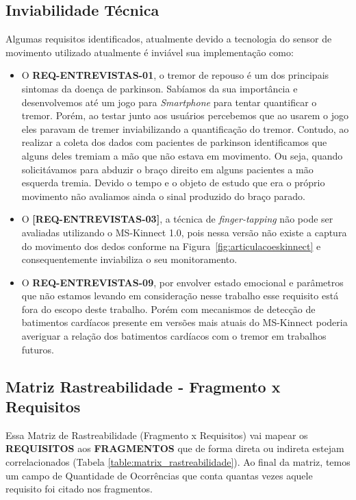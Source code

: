 \subsection{Inviabilidade Técnica}
Algumas requisitos identificados, atualmente devido a tecnologia do sensor de movimento utilizado atualmente é inviável sua implementação como:
\begin{itemize}
  \item O \textbf{REQ-ENTREVISTAS-01}, o tremor de repouso é um dos principais sintomas da doença de parkinson. Sabíamos da sua importância e desenvolvemos até um jogo para \textit{Smartphone} para tentar quantificar o tremor. Porém, ao testar junto aos usuários percebemos que ao usarem o jogo eles paravam de tremer inviabilizando a quantificação do tremor. 
	Contudo, ao realizar a coleta dos dados com pacientes de parkinson identificamos que alguns deles tremiam a mão que não estava em movimento. Ou seja, quando solicitávamos para abduzir o braço direito em alguns pacientes a mão esquerda tremia. Devido o tempo e o objeto de estudo que era o próprio movimento não avaliamos ainda o sinal produzido do braço parado.
	\item O \textbf{[REQ-ENTREVISTAS-03]}, a técnica de \textit{finger-tapping} não pode ser avaliadas utilizando o MS-Kinnect 1.0, pois nessa versão não existe a captura do movimento dos dedos conforme na Figura~\ref{fig:articulacoeskinnect} e consequentemente inviabiliza o seu monitoramento.
	\item O \textbf{REQ-ENTREVISTAS-09}, por envolver estado emocional e parâmetros que não estamos levando em consideração nesse trabalho esse requisito está fora do escopo deste trabalho. Porém com mecanismos de detecção de batimentos cardíacos presente em versões mais atuais do MS-Kinnect poderia averiguar a relação dos batimentos cardíacos com o tremor em trabalhos futuros.
\end{itemize}

\subsection{Matriz Rastreabilidade - Fragmento x Requisitos}
Essa Matriz de Rastreabilidade (Fragmento x Requisitos) vai mapear os \textbf{REQUISITOS} aos \textbf{FRAGMENTOS} que de forma direta ou indireta estejam correlacionados (Tabela \ref{table:matrix_rastreabilidade}). Ao final da matriz, temos um campo de Quantidade de Ocorrências que conta quantas vezes aquele requisito foi citado nos fragmentos.

